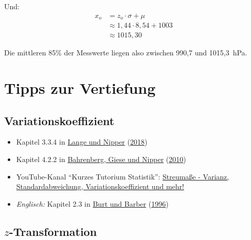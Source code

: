 \documentclass[
  11pt,
  ngerman,
  a4paper,
]{report}
\providecommand{\tightlist}{%
  \setlength{\itemsep}{0pt}\setlength{\parskip}{0pt}}
\begin{document}
Und:
\[
  \begin{aligned}
    x_o&=z_o\cdot \sigma + \mu  \\
    &\approx1{,}44 \cdot 8{,}54 + 1003\\
    & \approx 1015{,}30
  \end{aligned}
\]

Die mittleren 85\% der Messwerte liegen also zwischen 990,7 und 1015,3~hPa.

\hypertarget{tipps-zur-vertiefung-2}{%
\section*{Tipps zur Vertiefung}\label{tipps-zur-vertiefung-2}}

\hypertarget{variationskoeffizient-1}{%
\subsection{Variationskoeffizient}\label{variationskoeffizient-1}}

\begin{itemize}
\tightlist
\item
  Kapitel 3.3.4 in \protect\hyperlink{ref-delange}{Lange und Nipper} (\protect\hyperlink{ref-delange}{2018})
\item
  Kapitel 4.2.2 in \protect\hyperlink{ref-bahrenberg}{Bahrenberg, Giese und Nipper} (\protect\hyperlink{ref-bahrenberg}{2010})
\item
  YouTube-Kanal \enquote{Kurzes Tutorium Statistik}: \href{https://www.youtube.com/watch?v=3oZrS3ZWVcA}{Streumaße - Varianz, Standardabweichung, Variationskoeffizient und mehr!}
\item
  \emph{Englisch:} Kapitel 2.3 in \protect\hyperlink{ref-burt}{Burt und Barber} (\protect\hyperlink{ref-burt}{1996})
\end{itemize}

\hypertarget{z-transformation-1}{%
\subsection{\texorpdfstring{\(z\)-Transformation}{z-Transformation}}\label{z-transformation-1}}
\end{document}
